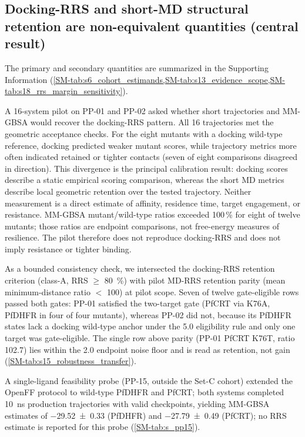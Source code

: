 \documentclass[journal=jcisd8,manuscript=article,layout=traditional]{achemso}
\begin{document}
\subsection{Docking-RRS and short-MD structural retention are non-equivalent quantities (central result)}

The primary and secondary quantities are summarized in the Supporting Information (\cref{SM-tab:s6_cohort_estimands,SM-tab:s13_evidence_scope,SM-tab:s18_rrs_margin_sensitivity}).

A 16-system pilot on PP-01 and PP-02 asked whether short trajectories and MM-GBSA would recover the docking-RRS pattern. All 16 trajectories met the geometric acceptance checks. For the eight mutants with a docking wild-type reference, docking predicted weaker mutant scores, while trajectory metrics more often indicated retained or tighter contacts (seven of eight comparisons disagreed in direction). This divergence is the principal calibration result: docking scores describe a static empirical scoring comparison, whereas the short MD metrics describe local geometric retention over the tested trajectory. Neither measurement is a direct estimate of affinity, residence time, target engagement, or resistance. MM-GBSA mutant/wild-type ratios exceeded \num{100}\,\% for eight of twelve mutants; those ratios are endpoint comparisons, not free-energy measures of resilience. The pilot therefore does not reproduce docking-RRS and does not imply resistance or tighter binding.

As a bounded consistency check, we intersected the docking-RRS retention criterion (class-A, RRS $\geq$ \qty{80}{\percent}) with pilot MD-RRS retention parity (mean minimum-distance ratio $<$ \num{100}) at pilot scope. Seven of twelve gate-eligible rows passed both gates: PP-01 satisfied the two-target gate (PfCRT via K76A, PfDHFR in four of four mutants), whereas PP-02 did not, because its PfDHFR states lack a docking wild-type anchor under the \qty{5.0}{\kcalmol} eligibility rule and only one target was gate-eligible. The single row above parity (PP-01 PfCRT K76T, ratio \num{102.7}) lies within the \qty{2.0}{\kcalmol} endpoint noise floor and is read as retention, not gain (\cref{SM-tab:s15_robustness_transfer}).

A single-ligand feasibility probe (PP-15, outside the Set-C cohort) extended the OpenFF protocol to wild-type PfDHFR and PfCRT; both systems completed \qty{10}{ns} production trajectories with valid checkpoints, yielding MM-GBSA estimates of \qty{-29.52 \pm 0.33}{\kcalmol} (PfDHFR) and \qty{-27.79 \pm 0.49}{\kcalmol} (PfCRT); no RRS estimate is reported for this probe (\cref{SM-tab:s_pp15}).
\end{document}
